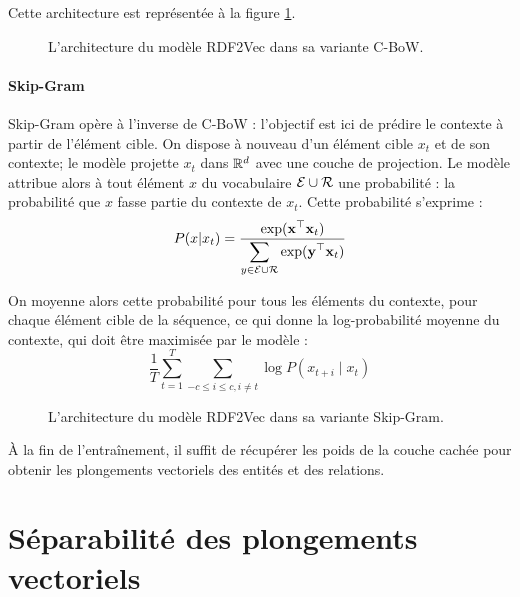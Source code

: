 Cette architecture est représentée à la figure \ref{fig:rdf2vec-cbow}.

\begin{figure}[h]
    \centering
    
    \caption[Architecture de RDF2Vec-CBoW]{L'architecture du modèle RDF2Vec dans sa variante C-BoW.}
    \label{fig:rdf2vec-cbow}
\end{figure}

\paragraph{Skip-Gram}

Skip-Gram opère à l'inverse de C-BoW : l'objectif est ici de prédire le contexte à partir de l'élément cible. On dispose à nouveau d'un élément cible $x_t$ et de son contexte; le modèle projette $x_t$ dans $\mathbb{R}^d$ avec une couche de projection. Le modèle attribue alors à tout élément $x$ du vocabulaire $\mathcal{E} \cup \mathcal{R}$ une probabilité : la probabilité que $x$ fasse partie du contexte de $x_t$. Cette probabilité s'exprime :
\begin{equation}
    P(x | x_t) = \frac{
    \displaystyle \exp(\mathbf{x}^\top \mathbf{x}_t)}
    {\displaystyle \sum_{y \in \mathcal{E} \cup \mathcal{R}} \exp(\mathbf{y}^\top \mathbf{x}_t)}
\end{equation}

On moyenne alors cette probabilité pour tous les éléments du contexte, pour chaque élément cible de la séquence, ce qui donne la log-probabilité moyenne du contexte, qui doit être maximisée par le modèle :
\begin{equation}
    \frac{1}{T} \sum_{t = 1}^{T} \sum_{-c \leq i \leq c, i \neq t} \log P(x_{t+i} \mid x_t)
\end{equation}

\begin{figure}[h]
    \centering
    
    \caption[Architecture de RDF2Vec-Skip-Gram]{L'architecture du modèle RDF2Vec dans sa variante Skip-Gram.}
    \label{fig:rdf2vec-skipgram}
\end{figure}

À la fin de l'entraînement, il suffit de récupérer les poids de la couche cachée pour obtenir les plongements vectoriels des entités et des relations.

\FloatBarrier


\section{Séparabilité des plongements vectoriels}


